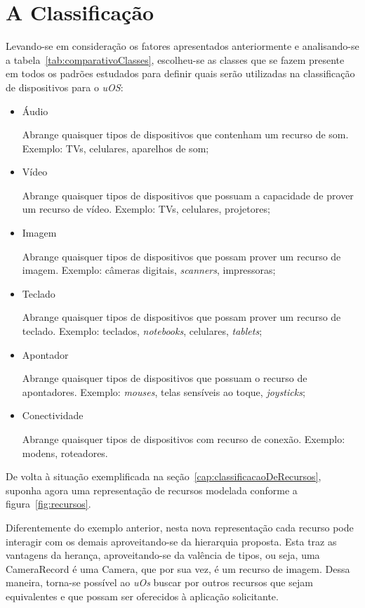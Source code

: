 \section{A Classificação}
Levando-se em consideração os fatores apresentados anteriormente e analisando-se a tabela~\ref{tab:comparativoClasses}, escolheu-se as classes que se fazem presente em todos os padrões estudados para definir quais serão utilizadas na classificação de dispositivos para o \emph{uOS}:

\begin{itemize}
	\item Áudio
		
		Abrange quaisquer tipos de dispositivos que contenham um recurso de som. Exemplo: TVs, celulares, aparelhos de som;
	\item Vídeo
		
		Abrange quaisquer tipos de dispositivos que possuam a capacidade de prover um recurso de vídeo. Exemplo: TVs, celulares, projetores;
	\item Imagem
		
		Abrange quaisquer tipos de dispositivos que possam prover um recurso de imagem. Exemplo: câmeras digitais, \emph{scanners}, impressoras;
	\item Teclado
		
		Abrange quaisquer tipos de dispositivos que possam prover um recurso de teclado. Exemplo: teclados, \emph{notebooks}, celulares, \emph{tablets};
	\item Apontador
		
		Abrange quaisquer tipos de dispositivos que possuam o recurso de apontadores. Exemplo: \emph{mouses}, telas sensíveis ao toque, \emph{joysticks};
	\item Conectividade
		
		Abrange quaisquer tipos de dispositivos com recurso de conexão. Exemplo: modens, roteadores.
\end{itemize}

De volta à situação exemplificada na seção~\ref{cap:classificacaoDeRecursos}, suponha agora uma representação de recursos modelada conforme a figura~\ref{fig:recursos}. 

Diferentemente do exemplo anterior, nesta nova representação cada recurso pode interagir com os demais aproveitando-se da hierarquia proposta. Esta traz as vantagens da herança, aproveitando-se da valência de tipos, ou seja, uma CameraRecord é uma Camera, que por sua vez, é um recurso de imagem. Dessa maneira, torna-se possível ao \emph{uOs} buscar por outros recursos que sejam equivalentes e que possam ser oferecidos à aplicação solicitante.

